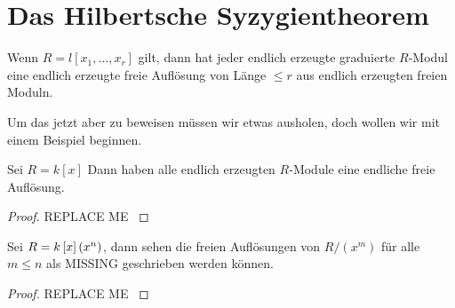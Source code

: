 \documentclass{article}
\begin{document}
\section{Das Hilbertsche Syzygientheorem}
	\begin{thm}
		Wenn 
		\( R = l \left[ x_1,\dots,x_r \right] \)
		gilt,
		dann hat jeder endlich erzeugte graduierte 
		\(R \)-Modul 
		eine endlich erzeugte freie Aufl\"osung von L\"ange 
		\( \le r \) 
		aus endlich erzeugten freien Moduln.
	\end{thm}
	Um das jetzt aber zu beweisen m\"ussen wir etwas ausholen, 
	doch wollen wir mit einem Beispiel beginnen.
	\begin{bsp}[\nocite{Eis1}{Exercise 1.22}]
		Sei 
		\( R = k\left[ x \right] \)
		Dann haben alle endlich erzeugten 
		\(R\)-Module 
		eine endliche freie Aufl\"osung.
		\begin{proof}
			{\color{red} REPLACE ME }		
		\end{proof}
	\end{bsp}	
	\begin{thm}
		
	\end{thm}
	\begin{bsp}
		Sei 
		\( R= k\left[ x \right] \/ \left( x^{n} \right) \),
		dann sehen die freien Aufl\"osungen von 
		\( R\big/ \left( x^{m} \right) \) 
		f\"ur alle 
		\( m \le n \)
		als 
		{\color{red}MISSING}
		geschrieben werden k\"onnen.
		\begin{proof}
			{\color{red} REPLACE ME }
		\end{proof}
	\end{bsp}
\end{document}
